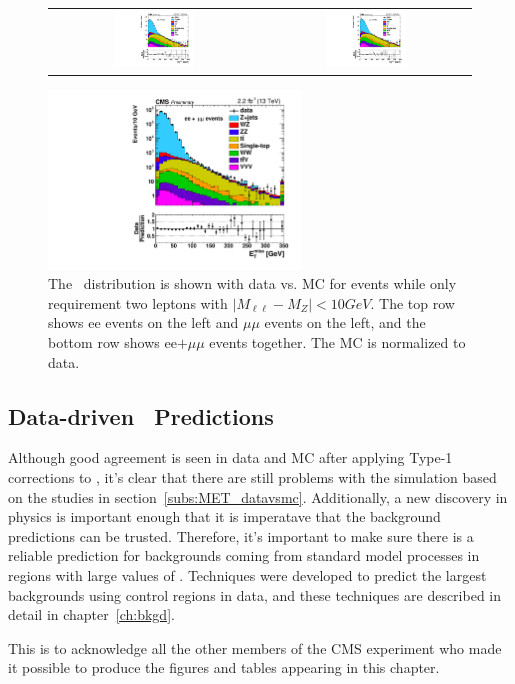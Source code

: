 \begin{figure}[!ht]
\begin{center}
\begin{tabular}{cc}
\includegraphics[width=0.4\textwidth]{MET/figs/h_met_T1CHS_pt_ee_inclusive_passtrig.pdf} &
\includegraphics[width=0.4\textwidth]{MET/figs/h_met_T1CHS_pt_mm_inclusive_passtrig.pdf} \\
\end{tabular}
\includegraphics[width=0.6\textwidth]{MET/figs/h_met_T1CHS_pt_ll_inclusive_passtrig.pdf}
\caption{
  The \MET\ distribution is shown with data vs. MC for events while only requirement two leptons with $|M_{\ell\ell}-M_{Z}| < 10 GeV$.
  The top row shows ee events on the left and $\mu\mu$ events on the left,
  and the bottom row shows ee$+\mu\mu$ events together.
  The MC is normalized to data.
\label{fig:T1MET_datavsmc}
}
\end{center}
\end{figure}

\subsection{Data-driven \texorpdfstring{\MET}{MET}\ Predictions}
Although good agreement is seen in data and MC after applying Type-1 corrections to \MET, 
it's clear that there are still problems with the simulation based on the studies in section~\ref{subs:MET_datavsmc}.
Additionally, a new discovery in physics is important enough that it is imperatave that the background predictions can be trusted.
Therefore, it's important to make sure there is a reliable prediction for backgrounds coming from standard model processes in regions with large values of \MET.
Techniques were developed to predict the largest backgrounds using control regions in data,
and these techniques are described in detail in chapter~\ref{ch:bkgd}.

This is to acknowledge all the other members of the CMS experiment who made it possible to produce
the figures and tables appearing in this chapter.

